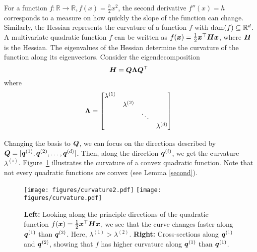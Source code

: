 \documentclass{article}
\newcommand{\R}{\mathbb{R}}
\begin{document}
For a function $f:\R\to\R, f(x) = \frac{h}{2}x^{2}$, the second derivative $f''(x) = h$ corresponds to a measure on how quickly the slope of the function can change. Similarly, the Hessian represents the curvature of a function $f$ with $\dom(f)\subseteq \R^d$. A multivariate quadratic function $f$ can be written as $f({\bm{x}}) = \frac{1}{2}{\bm{x}}^\top {\bm{H}} {\bm{x}} $, where ${\bm{H}}$ is the Hessian. The eigenvalues of the Hessian determine the curvature of the function along its eigenvectors. Consider the eigendecomposition\footnotemark[3]
\begin{equation}\label{eigendec}
	{\bm{H}} = {\bm{Q}} {\bm{\Lambda}} {\bm{Q}}^\top
\end{equation}{}
where
\[
{\bm{\Lambda}} = \begin{bmatrix}
        \lambda^{(1)} & & & \\
        & \lambda^{(2)} & & \\
        & & \ddots & \\
        & & & \lambda^{(d)} \\
    \end{bmatrix}
\]

Changing the basis to ${\bm{Q}}$, we can focus on the directions described by ${\bm{Q}}=[{\bm{q}}^{(1)}, {\bm{q}}^{(2)}, \ldots, {\bm{q}}^{(d)}]$. Then, along the direction ${\bm{q}}^{(i)}$, we get the curvature $\lambda^{(i)}$. Figure~\ref{fig:curvature2} illustrates the curvature of a convex quadratic function. Note that not every quadratic functions are convex (see Lemma \ref{second}).

\begin{figure}[ht]
\centering
    \texttt{[image: figures/curvature2.pdf]}\qquad\qquad
    \texttt{[image: figures/curvature.pdf]}
    \caption[]{\textbf{Left:} Looking along the principle directions of the quadratic function $f({\bm{x}}) = \frac{1}{2} {\bm{x}}^\top {\bm{H}} {\bm{x}} $, we see that the curve changes faster along ${\bm{q}}^{(1)}$ than ${\bm{q}}^{(2)}$. Here\footnotemark[4], $\lambda^{(1)} > \lambda^{(2)}$. \textbf{Right:} Cross-sections along ${\bm{q}}^{(1)}$ and ${\bm{q}}^{(2)}$, showing that $f$ has higher curvature along ${\bm{q}}^{(1)}$ than ${\bm{q}}^{(1)}$.}
    \label{fig:curvature2}
\end{figure}
\end{document}
